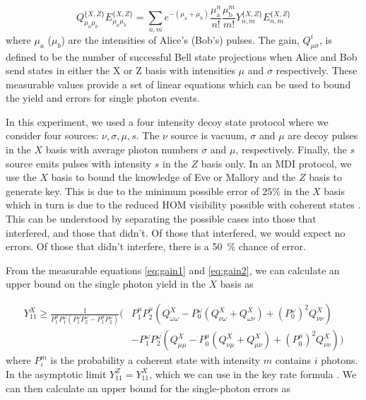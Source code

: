 \begin{equation}
	\label{eq:gain2}
	Q^{\{X, Z\}}_{\mu_{a} \mu_{b}} E^{\{X, Z\}}_{\mu_{a} \mu_{b}}=\sum_{n, m} e^{-\left(\mu_{\mathrm{a}}+\mu_{\mathrm{b}}\right)} \frac{\mu_{\mathrm{a}}^{n}}{n !} \frac{\mu_{\mathrm{b}}^{m}}{m !} Y^{\{X, Z\}}_{n, m} E^{\{X, Z\}}_{n, m}
\end{equation}
where $\mu_a$ ($\mu_b$) are the intensities of Alice's (Bob's) pulses. The gain, $Q_{\mu\sigma}^i$, is defined to be the number of successful Bell state projections when Alice and Bob send states in either the X or Z basis with intensities $\mu$ and $\sigma$ respectively. These measurable values provide a set of linear equations which can be used to bound the yield and errors for single photon events.

In this experiment, we used a four intensity decoy state protocol \cite{zhou2016} where we consider four sources: $\nu, \sigma, \mu, s$. The $\nu$ source is vacuum, $\sigma$ and $\mu$ are decoy pulses in the $X$ basis with average photon numbers $\sigma$ and $\mu$, respectively. Finally, the $s$ source emits pulses with intensity $s$ in the $Z$ basis only. In an \ac{MDI} protocol, we use the $X$ basis to bound the knowledge of Eve or Mallory and the $Z$ basis to generate key. This is due to the minimum possible error of $25\%$ in the $X$ basis \cite{Rubenok2013} which in turn is due to the reduced \ac{HOM} visibility possible with coherent states \cite{Rarity2005}. This can be understood by separating the possible cases into those that interfered, and those that didn't. Of those that interfered, we would expect no errors. Of those that didn't interfere, there is a \SI{50}{\percent} chance of error. 

From the measurable equations \ref{eq:gain1} and \ref{eq:gain2}, we can calculate an upper bound on the single photon yield in the $X$ basis as

\begin{equation}
	\begin{split}
	Y^X_{11} \ge \frac{1}{P^\mu_1 P^\omega_1 ( P^\omega_1  P^\omega_2 - P^\mu_1 P^\omega_2)} \Big(&P^\mu_1 P^\mu_2 (Q_{\omega\omega}^{X} - P^\omega_0 ( Q_{\nu\omega}^X + Q_{\omega\nu}^X) + (P^\omega_0)^2 Q_{\nu\nu}^X) \\
	&- P^\omega_1 P^\omega_2(Q_{\mu\mu}^{X} - P^\mu_0 ( Q_{\nu\mu}^X + Q_{\mu\nu}^X) + (P^\mu_0)^2 Q_{\nu\nu}^X)\Big)
	\end{split}
\end{equation}
where $P_i^m$ is the probability a coherent state with intensity $m$ contains $i$ photons. In the asymptotic limit $Y^Z_{11} =  Y^X_{11}$, which we can use in the key rate formula \cite{Wang2019asymmetric}. We can then calculate an upper bound for the single-photon errors as 

